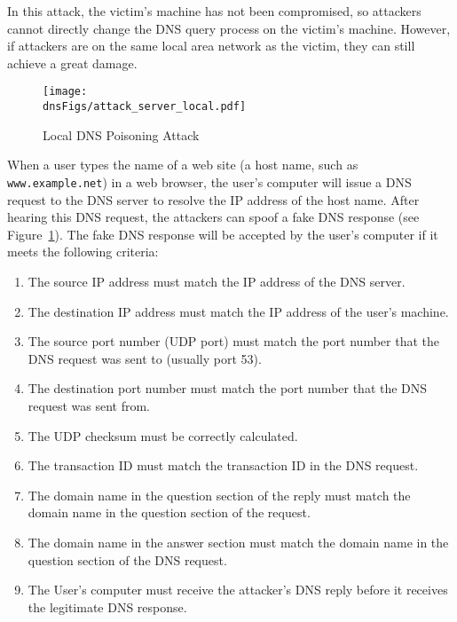 In this attack, the victim's machine has not been compromised, so attackers cannot
directly change the DNS query process on the victim's machine. However,
if attackers are on the same local area network as the victim, they 
can still achieve a great damage. 

\begin{figure}[htb]
\centering
\texttt{[image: \\dnsFigs/attack\_server\_local.pdf]}
\caption{Local DNS Poisoning Attack}
\label{dns:fig:local_attack}
\end{figure}


When a user types the name of a web site (a host name, such as {\tt
www.example.net})
in a web browser, the user's computer will issue a DNS request to the DNS 
server to resolve the IP address of the host name.  After hearing this DNS 
request, the attackers can spoof a fake DNS response (see
Figure~\ref{dns:fig:local_attack}). 
The fake DNS response 
will be accepted by the user's computer if it meets 
the following criteria:

\begin{enumerate}

\item The source IP address must match the IP address of the DNS server.

\item The destination IP address must match the IP address of the user's machine.

\item The source port number (UDP port) must match the port number that the DNS
request was sent to (usually port 53).

\item The destination port number must match the port number that the DNS
request was sent from.

\item The UDP checksum must be correctly calculated. 

\item The transaction ID must match the transaction ID in the DNS request.

\item The domain name in the question section of the reply must match the 
domain name in the question section of the request.

\item The domain name in the answer section must match the domain name in the
question section of the DNS request.

\item The User's computer must receive the attacker's DNS reply before it
receives the legitimate DNS response.
\end{enumerate}


